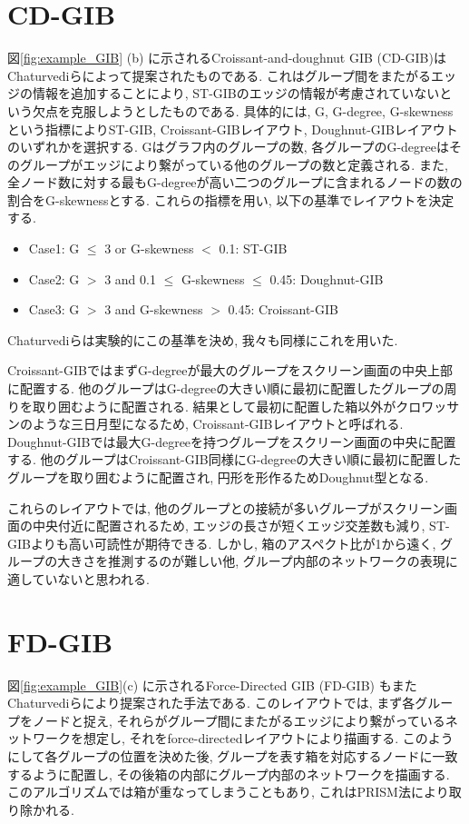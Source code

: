 \documentclass{kuee}
\begin{document}
\section{CD-GIB}
図\ref{fig:example_GIB} (b) に示されるCroissant-and-doughnut GIB (CD-GIB)はChaturvediら\cite{chaturvedi2014group}によって提案されたものである.
これはグループ間をまたがるエッジの情報を追加することにより, ST-GIBのエッジの情報が考慮されていないという欠点を克服しようとしたものである.
具体的には, G, G-degree, G-skewnessという指標によりST-GIB, Croissant-GIBレイアウト, Doughnut-GIBレイアウトのいずれかを選択する.
Gはグラフ内のグループの数, 各グループのG-degreeはそのグループがエッジにより繋がっている他のグループの数と定義される.
また, 全ノード数に対する最もG-degreeが高い二つのグループに含まれるノードの数の割合をG-skewnessとする.
これらの指標を用い, 以下の基準でレイアウトを決定する.
\begin{itemize}
  \item Case1: G $\le$ 3 or G-skewness $<$ 0.1: ST-GIB
  \item Case2: G $>$ 3 and 0.1 $\le$ G-skewness $\le$ 0.45: Doughnut-GIB
  \item Case3: G $>$ 3 and G-skewness $>$ 0.45: Croissant-GIB
\end{itemize}
Chaturvediらは実験的にこの基準を決め, 我々も同様にこれを用いた.

Croissant-GIBではまずG-degreeが最大のグループをスクリーン画面の中央上部に配置する.
他のグループはG-degreeの大きい順に最初に配置したグループの周りを取り囲むように配置される.
結果として最初に配置した箱以外がクロワッサンのような三日月型になるため, Croissant-GIBレイアウトと呼ばれる.
Doughnut-GIBでは最大G-degreeを持つグループをスクリーン画面の中央に配置する.
他のグループはCroissant-GIB同様にG-degreeの大きい順に最初に配置したグループを取り囲むように配置され, 円形を形作るためDoughnut型となる.

これらのレイアウトでは, 他のグループとの接続が多いグループがスクリーン画面の中央付近に配置されるため, エッジの長さが短くエッジ交差数も減り, ST-GIBよりも高い可読性が期待できる.
しかし, 箱のアスペクト比が1から遠く, グループの大きさを推測するのが難しい他, グループ内部のネットワークの表現に適していないと思われる.

\section{FD-GIB}
図\ref{fig:example_GIB}(c) に示されるForce-Directed GIB (FD-GIB) もまたChaturvediら\cite{chaturvedi2014group}により提案された手法である.
このレイアウトでは, まず各グループをノードと捉え, それらがグループ間にまたがるエッジにより繋がっているネットワークを想定し, それをforce-directedレイアウトにより描画する.
このようにして各グループの位置を決めた後, グループを表す箱を対応するノードに一致するように配置し,
その後箱の内部にグループ内部のネットワークを描画する.
このアルゴリズムでは箱が重なってしまうこともあり, これはPRISM法により取り除かれる\cite{gansner2008efficient}.
\end{document}
